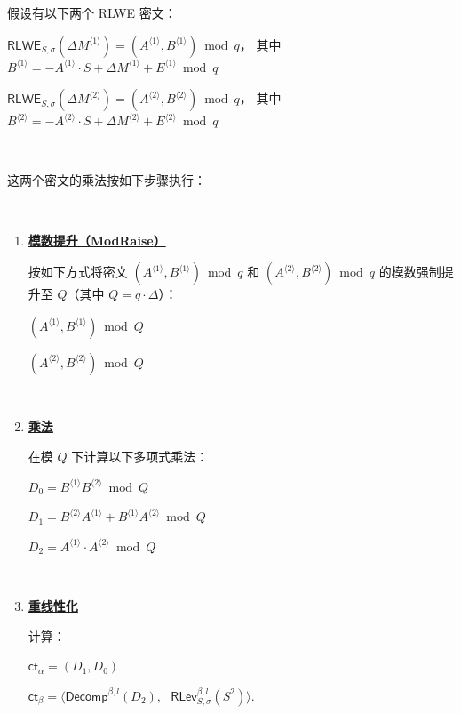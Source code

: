 \begin{tcolorbox}[title={\textbf{\tboxlabel{\ref*{subsubsec:bfv-mult-cipher-summary}} BFV 的密文与密文相乘}}]


假设有以下两个 RLWE 密文：

$\textsf{RLWE}_{S, \sigma}(\Delta M^{\langle 1 \rangle}) = (A^{\langle 1 \rangle}, B^{\langle 1 \rangle}) \bmod q$，\text{ } 其中 $B^{\langle 1 \rangle} = -A^{\langle 1 \rangle} \cdot S + \Delta M^{\langle 1 \rangle} + E^{\langle 1 \rangle} \bmod q$

$\textsf{RLWE}_{S, \sigma}(\Delta M^{\langle 2 \rangle}) = (A^{\langle 2 \rangle}, B^{\langle 2 \rangle})  \bmod q$，\text{ } 其中 $B^{\langle 2 \rangle} = -A^{\langle 2 \rangle} \cdot S + \Delta M^{\langle 2 \rangle} + E^{\langle 2 \rangle} \bmod q$

$ $

这两个密文的乘法按如下步骤执行：

$ $

\begin{enumerate}

\item \textbf{\underline{模数提升（\textsf{ModRaise}）}}

按如下方式将密文 $(A^{\langle 1 \rangle}, B^{\langle 1 \rangle}) \bmod q$ 和 $(A^{\langle 2 \rangle}, B^{\langle 2 \rangle}) \bmod q$ 的模数强制提升至 $Q$（其中 $Q = q \cdot \Delta$）：

$(A^{\langle 1 \rangle}, B^{\langle 1 \rangle}) \bmod Q$

$(A^{\langle 2 \rangle}, B^{\langle 2 \rangle}) \bmod Q$


$ $

\item \textbf{\underline{乘法}}

在模 $Q$ 下计算以下多项式乘法：

$D_0 = B^{\langle 1 \rangle}B^{\langle 2 \rangle} \bmod Q$

$D_1 = B^{\langle 2 \rangle}A^{\langle 1 \rangle} +  B^{\langle 1 \rangle}A^{\langle 2 \rangle} \bmod Q$

$D_2 = A^{\langle 1 \rangle} \cdot A^{\langle 2 \rangle} \bmod Q$


$ $

\item \textbf{\underline{重线性化}}


计算：

$ \textsf{ct}_\alpha = (D
_1, D_0)$

$ \textsf{ct}_\beta = \bm{\langle} \textsf{Decomp}^{\beta, l}(D_2), \text{ } \textsf{RLev}_{S, \sigma}^{\beta, l}( S^2) \bm{\rangle}$.


\end{enumerate}
\end{tcolorbox}
